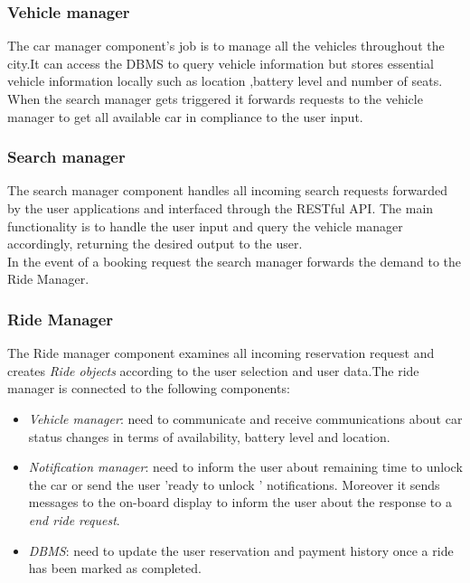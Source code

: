 \subsubsection{Vehicle manager}
The car manager component's job is to manage all the vehicles throughout the city.It can access the DBMS to query vehicle information but stores essential vehicle information locally such as location ,battery level and number of seats. When the search manager gets triggered it forwards requests to the vehicle manager to get all 
available car in compliance to the user input.
\subsubsection{Search manager}
The search manager component handles all incoming search requests forwarded by the user applications and interfaced through the RESTful API. The main functionality is to handle the user input and query the vehicle manager accordingly, returning the desired output to the user.\\In the event of a booking request the search manager forwards the demand to the Ride Manager.
\subsubsection{Ride Manager}
The Ride manager component examines all incoming reservation request and creates \textit{Ride objects} according to the user selection and user data.The ride manager
is connected to the following components:
\begin{itemize}
\item \textit{Vehicle manager}: need to communicate and receive communications about car status changes in terms of availability, battery level and location.
\item \textit{Notification manager}: need to inform the user about remaining time to unlock the car or send the user 'ready to unlock ' notifications. Moreover it sends messages to the on-board display to inform the user about the response to a \textit{end ride request}.
\item \textit{DBMS}: need to update the user reservation and payment history once a ride has been marked as completed.  
\end{itemize}
\newpage
